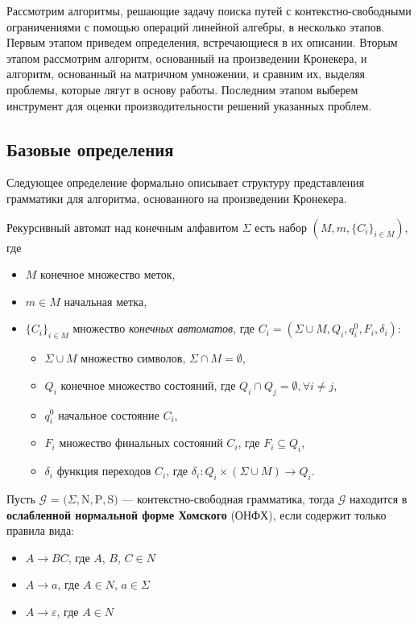 \label{sec:relatedworks}
Рассмотрим алгоритмы, решающие задачу поиска путей с контекстно-свободными ограничениями с помощью операций линейной алгебры, в несколько этапов. Первым этапом приведем определения, встречающиеся в их описании. Вторым этапом рассмотрим алгоритм, основанный на произведении Кронекера, и алгоритм, основанный на матричном умножении, и сравним их, выделяя проблемы, которые лягут в основу работы. Последним этапом выберем инструмент для оценки производительности решений указанных проблем.
\subsection{Базовые определения}

Следующее определение формально описывает структуру представления грамматики для алгоритма, основанного на произведении Кронекера.
\theoremstyle{definition}
\begin{definition}
Рекурсивный автомат \cite{rec} над конечным алфавитом $\Sigma$ есть набор $(M,m,\{C_i\}_{i \in M})$, где 

\begin{itemize}
    \item $M$ конечное множество меток,
    \item $m \in M$ начальная метка,
    \item $ \{C_i\}_{i \in M} $ множество \textit{конечных автоматов},
          где $C_i=(\Sigma \cup M, Q_i,q_i^0,F_i,\delta_i)$:
    \begin{itemize}
        \item $\Sigma \cup M$ множество символов, $\Sigma \cap M = \emptyset$,
        \item $Q_i$ конечное множество состояний,
              где $Q_i \cap Q_j = \emptyset, \forall i \neq j$,
        \item $q_i^0$ начальное состояние $C_i$,
        \item $F_i$ множество финальных состояний $C_i$, где $F_i \subseteq Q_i$,
        \item $\delta_i$ функция переходов $C_i$,
              где $\delta_i: Q_i \times (\Sigma \cup M)
              \to Q_i$.
    \end{itemize}
\end{itemize}
\end{definition}

\begin{definition}
Пусть $\mathcal{G}$ = $( \Sigma, $N$, $P$, $S$ )$ --- контекстно-свободная грамматика, тогда $\mathcal{G}$ находится в \textbf{ослабленной нормальной форме Хомского} (ОНФХ), если содержит только правила вида:
\begin{itemize}
    \item $A \rightarrow BC$, где $A$, $B$, $C \in N$
    \item $A \rightarrow a$, где $A \in N$, $a \in \Sigma$
    \item $A \rightarrow \varepsilon$, где $A \in N$
\end{itemize}
\end{definition}

